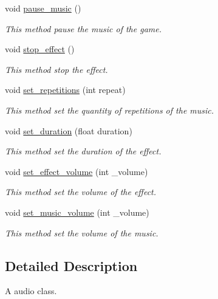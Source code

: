\begin{DoxyCompactItemize}
\item 
void \hyperlink{classengine_1_1_audio_a04276d10a4c43f6997ce61d197d0cd06}{pause\+\_\+music} ()
\begin{DoxyCompactList}\small\item\em This method pause the music of the game. \end{DoxyCompactList}\item 
void \hyperlink{classengine_1_1_audio_a69d99c1da8a77dc660a18ae9234d57b9}{stop\+\_\+effect} ()
\begin{DoxyCompactList}\small\item\em This method stop the effect. \end{DoxyCompactList}\item 
void \hyperlink{classengine_1_1_audio_ab2cf1a3543da1043fdf7321e17b3d75e}{set\+\_\+repetitions} (int repeat)
\begin{DoxyCompactList}\small\item\em This method set the quantity of repetitions of the music. \end{DoxyCompactList}\item 
void \hyperlink{classengine_1_1_audio_a911a2913f86b8e09485662613d9c34a7}{set\+\_\+duration} (float duration)
\begin{DoxyCompactList}\small\item\em This method set the duration of the effect. \end{DoxyCompactList}\item 
void \hyperlink{classengine_1_1_audio_a05a6030343dc02aedff9efd8030276fc}{set\+\_\+effect\+\_\+volume} (int \+\_\+volume)
\begin{DoxyCompactList}\small\item\em This method set the volume of the effect. \end{DoxyCompactList}\item 
void \hyperlink{classengine_1_1_audio_aa44f63fae08d1cf93ca787a05d29ab5f}{set\+\_\+music\+\_\+volume} (int \+\_\+volume)
\begin{DoxyCompactList}\small\item\em This method set the volume of the music. \end{DoxyCompactList}\end{DoxyCompactItemize}


\subsection{Detailed Description}
A audio class. 

